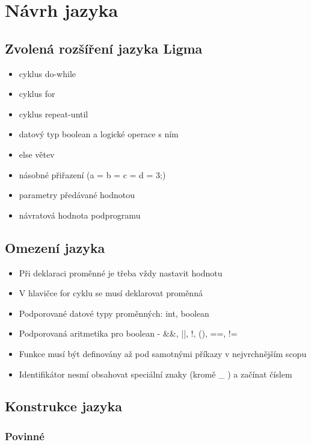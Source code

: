 \documentclass[czech, oth, kiv, he, iso690numb, viewonly]{fasthesis}
\begin{document}
\chapter{Návrh jazyka}

\section{Zvolená rozšíření jazyka Ligma}
\begin{itemize}
    \item cyklus do-while 
    \item cyklus for
    \item cyklus repeat-until
    \item datový typ boolean a logické operace s ním
    \item else větev
    \item násobné přiřazení (a = b = c = d = 3;)
    \item parametry předávané hodnotou
    \item návratová hodnota podprogramu
\end{itemize}

\section{Omezení jazyka}
\begin{itemize}
    \item Při deklaraci proměnné je třeba vždy nastavit hodnotu
    \item V hlavičce for cyklu se musí deklarovat proměnná
    \item Podporované datové typy proměnných: int, boolean
    \item Podporovaná aritmetika pro boolean - \&\&, ||, !, (), ==, !=
    \item Funkce musí být definovány až pod samotnými příkazy v nejvrchnějším scopu
    \item Identifikátor nesmí obsahovat speciální znaky (kromě \_ ) a začínat číslem
\end{itemize}

\section{Konstrukce jazyka}

\subsection{Povinné}
\end{document}

